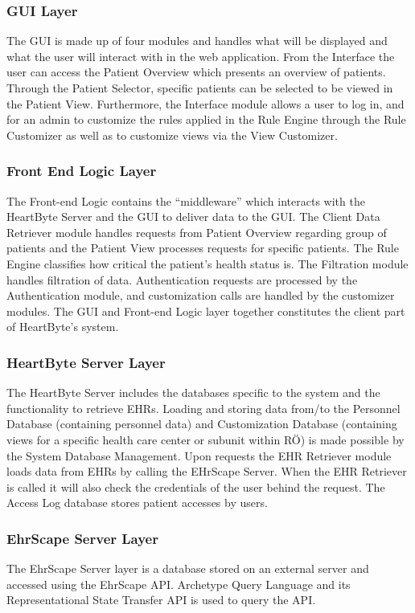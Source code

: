 \documentclass{scrreprt}
\begin{document}
\subsubsection{GUI Layer}
The GUI is made up of four modules and handles what will be displayed and what the user will interact with in the web application. From the Interface the user can access the Patient Overview which presents an overview of patients. Through the Patient Selector, specific patients can be selected to be viewed in the Patient View. Furthermore, the Interface module allows a user to log in, and for an admin to customize the rules applied in the Rule Engine through the Rule Customizer as well as to customize views via the View Customizer.

\subsubsection{Front End Logic Layer}
The Front-end Logic contains the “middleware” which interacts with the HeartByte Server and the GUI to deliver data to the GUI. The Client Data Retriever module handles requests from Patient Overview regarding group of patients and the Patient View processes requests for specific patients. The Rule Engine classifies how critical the patient’s health status is. The Filtration module handles filtration of data. Authentication requests are processed by the Authentication module, and customization calls are handled by the customizer modules. The GUI and Front-end Logic layer together constitutes the client part of HeartByte’s system.

\subsubsection{HeartByte Server Layer}
The HeartByte Server includes the databases specific to the system and the functionality to retrieve EHRs. Loading and storing data from/to the Personnel Database (containing personnel data) and Customization Database (containing views for a specific health care center or subunit within RÖ) is made possible by the System Database Management. Upon requests the EHR Retriever module loads data from EHRs by calling the EHrScape Server. When the EHR Retriever is called it will also check the credentials of the user behind the request. The Access Log database stores patient accesses by users.

\subsubsection{EhrScape Server Layer}
The EhrScape Server layer is a database stored on an external server and accessed using the EhrScape API. Archetype Query Language and its Representational State Transfer API is used to query the API.
\end{document}
